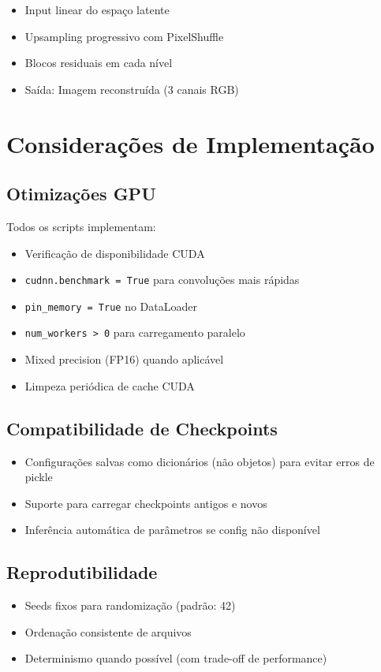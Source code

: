 \begin{itemize}
    \item Input linear do espaço latente
    \item Upsampling progressivo com PixelShuffle
    \item Blocos residuais em cada nível
    \item Saída: Imagem reconstruída (3 canais RGB)
\end{itemize}

\section{Considerações de Implementação}

\subsection{Otimizações GPU}

Todos os scripts implementam:

\begin{itemize}
    \item Verificação de disponibilidade CUDA
    \item \texttt{cudnn.benchmark = True} para convoluções mais rápidas
    \item \texttt{pin\_memory = True} no DataLoader
    \item \texttt{num\_workers > 0} para carregamento paralelo
    \item Mixed precision (FP16) quando aplicável
    \item Limpeza periódica de cache CUDA
\end{itemize}

\subsection{Compatibilidade de Checkpoints}

\begin{itemize}
    \item Configurações salvas como dicionários (não objetos) para evitar erros de pickle
    \item Suporte para carregar checkpoints antigos e novos
    \item Inferência automática de parâmetros se config não disponível
\end{itemize}

\subsection{Reprodutibilidade}

\begin{itemize}
    \item Seeds fixos para randomização (padrão: 42)
    \item Ordenação consistente de arquivos
    \item Determinismo quando possível (com trade-off de performance)
\end{itemize}
